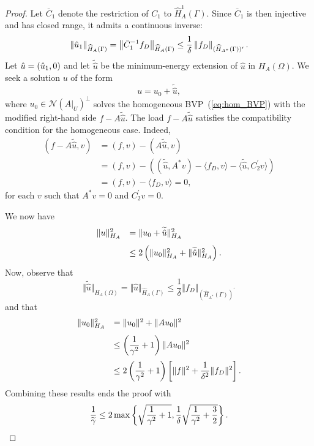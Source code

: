 \begin{proof}
Let $\bar{C}_1$ denote the restriction of $C_1$ to $\widehat{H}_A^1(\Gamma)$. Since $\bar{C}_1$ is then
injective and has closed range,
it admits a continuous inverse:
\[
\norm{ \hat{u}_1 }_{\widehat{H}_A(\Gamma)} = \norm{ \bar{C}_1^{-1} f_D }_{\widehat{H}_A(\Gamma)} \leq \frac{1}{\delta} \norm{ f_D }_{(\widehat{H}_{A^\ast}(\Gamma))^\prime}.
\]
Let $\hat{u} = \LRp{\hat{u}_1,0}$ and let $\tilde{\hat{u}}$ be the
minimum-energy extension of $\hat{u}$ in $H_A(\Omega)$.  We seek a solution $u$
of the form 
\[ u = u_0 + \tilde{\hat{u}},
\]
where $u_0 \in
\mathcal{N}(A\vert_U)^\perp$ solves the homogeneous BVP~(\ref{eq:hom_BVP})
with the modified right-hand side $f - A \tilde{\hat{u}}$. The load $f - A
\tilde{\hat{u}}$ satisfies the compatibility condition for the
homogeneous case. Indeed, 
\[
\begin{array}{rl}
(f - A \tilde{\hat{u}}, v) & = (f,v) - (A \tilde{\hat{u}},v) \\[8pt]
& = (f,v) - \left( (\tilde{\hat{u}},A^\ast v) - \langle f_D,v\rangle - \langle \tilde{\hat{u}},C_2^\prime v\rangle \right) \\[8pt]
& = (f,v) - \langle f_D,v\rangle = 0,
\end{array}
\]
for each $v$ such that $A^\ast v = 0$ and $C_2^\prime v = 0$.

We now have
\[
\begin{array}{ll}
\Vert u \Vert^2_{H_A} & = \Vert u_0 + \tilde{\hat{u}} \Vert^2_{H_A}\\[8pt]
& \le 2\LRp{\Vert u_0 \Vert^2_{H_A} + \Vert  \tilde{\hat{u}} \Vert^2_{H_A}}.
\end{array}
\]
Now, observe that
\[ \Vert \tilde{\hat{u}} \Vert_{H_A(\Omega)} =
\Vert \hat{u} \Vert_{\widehat{H}_A(\Gamma)} \leq \frac{1}{\delta} \Vert f_D
\Vert_{(\widehat{H}_{A^\ast}(\Gamma))^\prime}
\] 
and that
\[
\begin{array}{ll}
\Vert u_0 \Vert^2_{H_A} & = \Vert u_0 \Vert^2 + \Vert A u_0 \Vert^2 \\[8pt]
&\leq \ds \left(\frac{1}{\gamma^2} + 1 \right) \Vert A u_0 \Vert^2 \\[12pt]
& \ds \leq 2 \left(\frac{1}{\gamma^2} + 1 \right) \left[ \Vert f \Vert^2 + \frac{1}{\delta^2} \Vert f_D \Vert^2 \right].
\end{array}
\]
Combining these results ends the proof with
\[
\frac{1}{\tilde{\gamma}} \le 2\max\LRc{\sqrt{\frac{1}{\gamma^2} + 1}, \frac{1}{\delta}\sqrt{\frac{1}{\gamma^2} + \frac{3}{2}}}.
\]

\end{proof}

